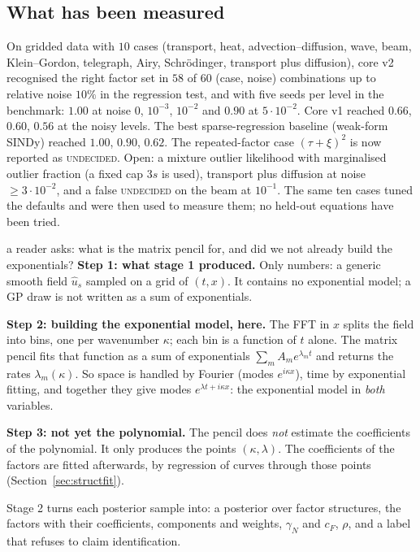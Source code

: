 \subsection{What has been measured}
On gridded data with $10$ cases (transport, heat, advection--diffusion, wave, beam, Klein--Gordon, telegraph, Airy, Schr\"odinger, transport plus diffusion), core v2 recognised the right factor set in $58$ of $60$ (case, noise) combinations up to relative noise $10\%$ in the regression test, and with five seeds per level in the benchmark: $1.00$ at noise $0$, $10^{-3}$, $10^{-2}$ and $0.90$ at $5\cdot10^{-2}$. Core v1 reached $0.66$, $0.60$, $0.56$ at the noisy levels. The best sparse-regression baseline (weak-form SINDy) reached $1.00$, $0.90$, $0.62$. The repeated-factor case $(\tau+\xi)^2$ is now reported as \textsc{undecided}. Open: a mixture outlier likelihood with marginalised outlier fraction (a fixed cap $3s$ is used), transport plus diffusion at noise $\ge3\cdot10^{-2}$, and a false \textsc{undecided} on the beam at $10^{-1}$. The same ten cases tuned the defaults and were then used to measure them; no held-out equations have been tried.

\begin{explained}{a reader asks: what is the matrix pencil for, and did we not already build the exponentials?}
\textbf{Step 1: what stage 1 produced.} Only numbers: a generic smooth field $\hat u_s$ sampled on a grid of $(t,x)$. It contains no exponential model; a GP draw is not written as a sum of exponentials.

\medskip\textbf{Step 2: building the exponential model, here.} The FFT in $x$ splits the field into bins, one per wavenumber $\kappa$; each bin is a function of $t$ alone. The matrix pencil fits that function as a sum of exponentials $\sum_mA_me^{\lambda_mt}$ and returns the rates $\lambda_m(\kappa)$. So space is handled by Fourier (modes $e^{i\kappa x}$), time by exponential fitting, and together they give modes $e^{\lambda t+i\kappa x}$: the exponential model in \emph{both} variables.

\medskip\textbf{Step 3: not yet the polynomial.} The pencil does \emph{not} estimate the coefficients of the polynomial. It only produces the points $(\kappa,\lambda)$. The coefficients of the factors are fitted afterwards, by regression of curves through those points (Section~\ref{sec:structfit}).
\end{explained}

\begin{takeaway}
Stage 2 turns each posterior sample into: a posterior over factor structures, the factors with their coefficients, components and weights, $\gamma_N$ and $c_F$, $\rho$, and a label that refuses to claim identification.
\end{takeaway}
